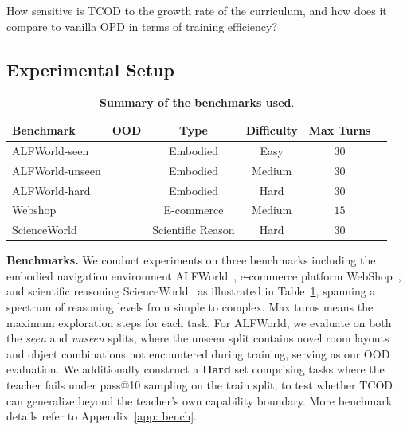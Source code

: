 \documentclass{article} %
\newcommand{\cmark}{\ding{51}}
\newcommand{\ours}{TCOD\xspace}
\newcommand{\todo}[1]{\textcolor{red}{\textbf{TODO:} #1}}
\begin{document}
 How sensitive is \ours to the growth rate 
of the curriculum, and how does it compare to vanilla OPD in terms 
of training efficiency?



\subsection{Experimental Setup}

\begin{table}
\vspace{-10pt}
\centering
\scriptsize
\setlength{\tabcolsep}{1.5pt}
\caption{\textbf{Summary of the benchmarks used}.}
\vspace{-1em}
\begin{tabular}{lccccc}
\toprule
\textbf{Benchmark}  & \textbf{OOD} & \textbf{Type} & \textbf{Difficulty}  & \textbf{Max Turns} \\
\midrule
ALFWorld-seen & & Embodied & Easy & $30$ \\
ALFWorld-unseen & \cmark & Embodied & Medium & $30$ \\
ALFWorld-hard  & \cmark & Embodied & Hard  & $30$ \\
Webshop  & & E-commerce & Medium   & $15$ \\
ScienceWorld  & & Scientific Reason & Hard  & $30$ \\
\bottomrule
\end{tabular}
\label{tab:dataset_summary}
\vspace{-10pt}
\end{table}


\textbf{Benchmarks.} 
We conduct experiments on three benchmarks including the embodied navigation environment ALFWorld~\citep{shridhar2020alfworld}, e-commerce platform WebShop~\citep{yao2022webshop}, and scientific reasoning ScienceWorld~\citep{wang2022scienceworld} as illustrated in Table~\ref{tab:dataset_summary}, spanning a spectrum of reasoning levels from simple to complex.
Max turns means the maximum exploration steps for each task.
For ALFWorld, we evaluate on both the \textit{seen} and 
\textit{unseen} splits, where the unseen split contains novel room 
layouts and object combinations not encountered during training, 
serving as our OOD evaluation.
We additionally construct a \textbf{Hard} set comprising 
tasks where the teacher fails under pass@10 sampling on the train split, to test 
whether \ours can generalize beyond the teacher's own capability 
boundary.
More benchmark details refer to Appendix~\ref{app: bench}.
\end{document}
